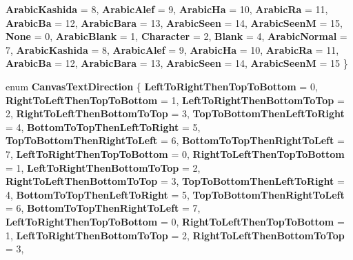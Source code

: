 \begin{DoxyCompactItemize}
\newline
{\bfseries Arabic\+Kashida} = 8, 
{\bfseries Arabic\+Alef} = 9, 
{\bfseries Arabic\+Ha} = 10, 
{\bfseries Arabic\+Ra} = 11, 
\newline
{\bfseries Arabic\+Ba} = 12, 
{\bfseries Arabic\+Bara} = 13, 
{\bfseries Arabic\+Seen} = 14, 
{\bfseries Arabic\+SeenM} = 15, 
\newline
{\bfseries None} = 0, 
{\bfseries Arabic\+Blank} = 1, 
{\bfseries Character} = 2, 
{\bfseries Blank} = 4, 
\newline
{\bfseries Arabic\+Normal} = 7, 
{\bfseries Arabic\+Kashida} = 8, 
{\bfseries Arabic\+Alef} = 9, 
{\bfseries Arabic\+Ha} = 10, 
\newline
{\bfseries Arabic\+Ra} = 11, 
{\bfseries Arabic\+Ba} = 12, 
{\bfseries Arabic\+Bara} = 13, 
{\bfseries Arabic\+Seen} = 14, 
\newline
{\bfseries Arabic\+SeenM} = 15
 \}
\item 
\mbox{\label{namespace_microsoft_1_1_graphics_1_1_canvas_1_1_text_a1e2efbc072261f0f4a89ae31e85b3d2a}} 
enum {\bfseries Canvas\+Text\+Direction} \{ \newline
{\bfseries Left\+To\+Right\+Then\+Top\+To\+Bottom} = 0, 
{\bfseries Right\+To\+Left\+Then\+Top\+To\+Bottom} = 1, 
{\bfseries Left\+To\+Right\+Then\+Bottom\+To\+Top} = 2, 
{\bfseries Right\+To\+Left\+Then\+Bottom\+To\+Top} = 3, 
\newline
{\bfseries Top\+To\+Bottom\+Then\+Left\+To\+Right} = 4, 
{\bfseries Bottom\+To\+Top\+Then\+Left\+To\+Right} = 5, 
{\bfseries Top\+To\+Bottom\+Then\+Right\+To\+Left} = 6, 
{\bfseries Bottom\+To\+Top\+Then\+Right\+To\+Left} = 7, 
\newline
{\bfseries Left\+To\+Right\+Then\+Top\+To\+Bottom} = 0, 
{\bfseries Right\+To\+Left\+Then\+Top\+To\+Bottom} = 1, 
{\bfseries Left\+To\+Right\+Then\+Bottom\+To\+Top} = 2, 
{\bfseries Right\+To\+Left\+Then\+Bottom\+To\+Top} = 3, 
\newline
{\bfseries Top\+To\+Bottom\+Then\+Left\+To\+Right} = 4, 
{\bfseries Bottom\+To\+Top\+Then\+Left\+To\+Right} = 5, 
{\bfseries Top\+To\+Bottom\+Then\+Right\+To\+Left} = 6, 
{\bfseries Bottom\+To\+Top\+Then\+Right\+To\+Left} = 7, 
\newline
{\bfseries Left\+To\+Right\+Then\+Top\+To\+Bottom} = 0, 
{\bfseries Right\+To\+Left\+Then\+Top\+To\+Bottom} = 1, 
{\bfseries Left\+To\+Right\+Then\+Bottom\+To\+Top} = 2, 
{\bfseries Right\+To\+Left\+Then\+Bottom\+To\+Top} = 3, 

\end{DoxyCompactItemize}
